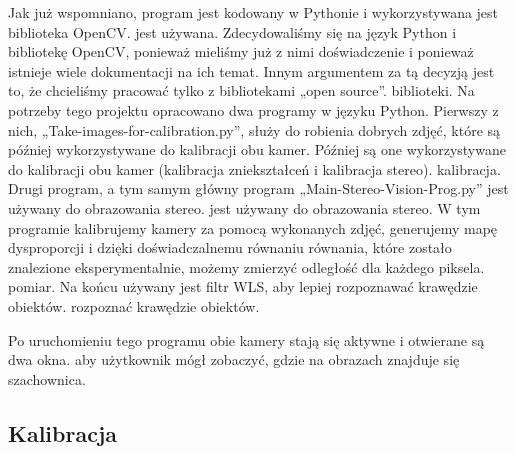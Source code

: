 \documentclass[magisterska]{pracadypl}
\begin{document}
Jak już wspomniano, program jest kodowany w Pythonie i wykorzystywana jest biblioteka OpenCV.
jest używana. Zdecydowaliśmy się na język Python i bibliotekę OpenCV, ponieważ
mieliśmy już z nimi doświadczenie i ponieważ istnieje wiele dokumentacji na ich temat. Innym
argumentem za tą decyzją jest to, że chcieliśmy pracować tylko z bibliotekami „open source”.
biblioteki.
Na potrzeby tego projektu opracowano dwa programy w języku Python.
Pierwszy z nich, „Take-images-for-calibration.py”, służy do robienia dobrych zdjęć, które są później wykorzystywane do kalibracji obu kamer.
Później są one wykorzystywane do kalibracji obu kamer (kalibracja zniekształceń i kalibracja stereo).
kalibracja.
Drugi program, a tym samym główny program „Main-Stereo-Vision-Prog.py” jest używany do obrazowania stereo.
jest używany do obrazowania stereo. W tym programie kalibrujemy kamery za pomocą wykonanych zdjęć, generujemy mapę dysproporcji i dzięki doświadczalnemu równaniu
równania, które zostało znalezione eksperymentalnie, możemy zmierzyć odległość dla każdego piksela.
pomiar. Na końcu używany jest filtr WLS, aby lepiej rozpoznawać krawędzie obiektów.
rozpoznać krawędzie obiektów.

Po uruchomieniu tego programu obie kamery stają się aktywne i otwierane są dwa okna.
aby użytkownik mógł zobaczyć, gdzie na obrazach znajduje się szachownica.


\subsection{Kalibracja}
\end{document}
